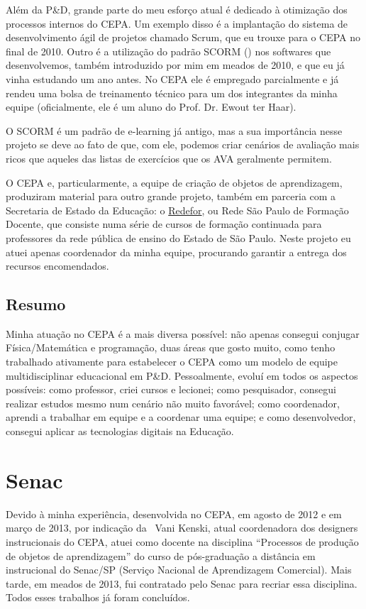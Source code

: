 Além da P\&D, grande parte do meu esforço atual é dedicado à otimização dos processos internos do CEPA. Um exemplo disso é a implantação do sistema de desenvolvimento ágil de projetos chamado Scrum, que eu trouxe para o CEPA no final de 2010. Outro é a utilização do padrão SCORM () nos softwares que desenvolvemos, também introduzido por mim em meados de 2010, e que eu já vinha estudando um ano antes. No CEPA ele é empregado parcialmente e já rendeu uma bolsa de treinamento técnico para um dos integrantes da minha equipe (oficialmente, ele é um aluno do Prof. Dr. Ewout ter Haar).

O SCORM é um padrão de e-learning já antigo, mas a sua importância nesse projeto se deve ao fato de que, com ele, podemos criar cenários de avaliação mais ricos que aqueles das listas de exercícios que os AVA geralmente permitem.

O CEPA e, particularmente, a equipe de criação de objetos de aprendizagem, produziram material para outro grande projeto, também em parceria com a Secretaria de Estado da Educação: o \href{http://redefor.usp.br/}{Redefor}, ou Rede São Paulo de Formação Docente, que consiste numa série de cursos de formação continuada para professores da rede pública de ensino do Estado de São Paulo. Neste projeto eu atuei apenas coordenador da minha equipe, procurando garantir a entrega dos recursos encomendados.

\subsection{Resumo}

Minha atuação no CEPA é a mais diversa possível: não apenas consegui conjugar Física/Matemática e programação, duas áreas que gosto muito, como tenho trabalhado ativamente para estabelecer o CEPA como um modelo de equipe multidisciplinar educacional em P\&D. Pessoalmente, evoluí em todos os aspectos possíveis: como professor, criei cursos e lecionei; como pesquisador, consegui realizar estudos mesmo num cenário não muito favorável; como coordenador, aprendi a trabalhar em equipe e a coordenar uma equipe; e como desenvolvedor, consegui aplicar as tecnologias digitais na Educação.

\section{Senac}

Devido à minha experiência, desenvolvida no CEPA, em agosto de 2012 e em março de 2013, por indicação da \profa\ Vani Kenski, atual coordenadora dos designers instrucionais do CEPA, atuei como docente na disciplina ``Processos de produção de objetos de aprendizagem'' do curso de pós-graduação a distância em  instrucional do Senac/SP (Serviço Nacional de Aprendizagem Comercial). Mais tarde, em meados de 2013, fui contratado pelo Senac para recriar essa disciplina. Todos esses trabalhos já foram concluídos.